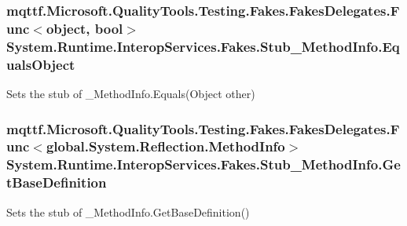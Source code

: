 \hypertarget{class_system_1_1_runtime_1_1_interop_services_1_1_fakes_1_1_stub___method_info_a654e0d69e453b0b703d8944f7be65e88}{
\subsubsection[{Equals\-Object}]{\setlength{\rightskip}{0pt plus 5cm}mqttf.\-Microsoft.\-Quality\-Tools.\-Testing.\-Fakes.\-Fakes\-Delegates.\-Func$<$object, bool$>$ System.\-Runtime.\-Interop\-Services.\-Fakes.\-Stub\-\_\-\-Method\-Info.\-Equals\-Object}}\label{class_system_1_1_runtime_1_1_interop_services_1_1_fakes_1_1_stub___method_info_a654e0d69e453b0b703d8944f7be65e88}


Sets the stub of \-\_\-\-Method\-Info.\-Equals(\-Object other)

\hypertarget{class_system_1_1_runtime_1_1_interop_services_1_1_fakes_1_1_stub___method_info_a04bdc77ba62bec862aa63f5291bf3704}{
\subsubsection[{Get\-Base\-Definition}]{\setlength{\rightskip}{0pt plus 5cm}mqttf.\-Microsoft.\-Quality\-Tools.\-Testing.\-Fakes.\-Fakes\-Delegates.\-Func$<$global.\-System.\-Reflection.\-Method\-Info$>$ System.\-Runtime.\-Interop\-Services.\-Fakes.\-Stub\-\_\-\-Method\-Info.\-Get\-Base\-Definition}}\label{class_system_1_1_runtime_1_1_interop_services_1_1_fakes_1_1_stub___method_info_a04bdc77ba62bec862aa63f5291bf3704}


Sets the stub of \-\_\-\-Method\-Info.\-Get\-Base\-Definition()

